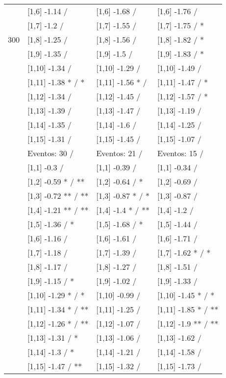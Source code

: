 \begin{table}
\begin{tabular}[t]{llll}
 & {}[1,6] -1.14  / & {}[1,6] -1.68  / & {}[1,6] -1.76  /\\
 & {}[1,7] -1.2  / & {}[1,7] -1.55  / & {}[1,7] -1.75  / *\\
300 & {}[1,8] -1.25  / & {}[1,8] -1.56  / & {}[1,8] -1.82  / *\\
\addlinespace
 & {}[1,9] -1.35  / & {}[1,9] -1.5  / & {}[1,9] -1.83  / *\\
 & {}[1,10] -1.34  / & {}[1,10] -1.29  / & {}[1,10] -1.49  /\\
 & {}[1,11] -1.38 * / * & {}[1,11] -1.56 * / & {}[1,11] -1.47  / *\\
 & {}[1,12] -1.34  / & {}[1,12] -1.45  / & {}[1,12] -1.57  / *\\
 & {}[1,13] -1.39  / & {}[1,13] -1.47  / & {}[1,13] -1.19  /\\
\addlinespace
 & {}[1,14] -1.35  / & {}[1,14] -1.6  / & {}[1,14] -1.25  /\\
 & {}[1,15] -1.31  / & {}[1,15] -1.45  / & {}[1,15] -1.07  /\\
 & Eventos:  30 / & Eventos:  21 / & Eventos:  15 /\\
 & {}[1,1] -0.3  / & {}[1,1] -0.39  / & {}[1,1] -0.34  /\\
 & {}[1,2] -0.59 * / ** & {}[1,2] -0.64  / * & {}[1,2] -0.69  /\\
\addlinespace
 & {}[1,3] -0.72 ** / ** & {}[1,3] -0.87 * / * & {}[1,3] -0.87  /\\
 & {}[1,4] -1.21 ** / ** & {}[1,4] -1.4 * / ** & {}[1,4] -1.2  /\\
 & {}[1,5] -1.36  / * & {}[1,5] -1.68  / * & {}[1,5] -1.44  /\\
 & {}[1,6] -1.16  / & {}[1,6] -1.61  / & {}[1,6] -1.71  /\\
 & {}[1,7] -1.18  / & {}[1,7] -1.39  / & {}[1,7] -1.62 * / *\\
\addlinespace
500 & {}[1,8] -1.17  / & {}[1,8] -1.27  / & {}[1,8] -1.51  /\\
 & {}[1,9] -1.15  / * & {}[1,9] -1.02  / & {}[1,9] -1.33  /\\
 & {}[1,10] -1.29 * / * & {}[1,10] -0.99  / & {}[1,10] -1.45 * / *\\
 & {}[1,11] -1.34 * / ** & {}[1,11] -1.25  / & {}[1,11] -1.85 * / **\\
 & {}[1,12] -1.26 * / ** & {}[1,12] -1.07  / & {}[1,12] -1.9 ** / **\\
\addlinespace
 & {}[1,13] -1.31  / * & {}[1,13] -1.06  / & {}[1,13] -1.62  /\\
 & {}[1,14] -1.3  / * & {}[1,14] -1.21  / & {}[1,14] -1.58  /\\
 & {}[1,15] -1.47  / ** & {}[1,15] -1.32  / & {}[1,15] -1.73  /\\
\bottomrule
\end{tabular}
\end{table}
